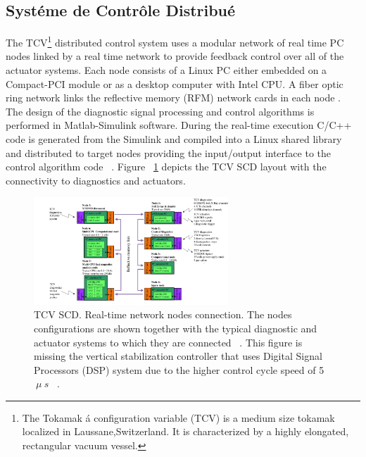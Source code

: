 \subsection{Syst\'eme de Contr\^ole Distribu\'e}

The TCV\footnote{The Tokamak \'a configuration variable (TCV) is  a medium size tokamak localized in Laussane,Switzerland. It is characterized by a highly elongated, rectangular vacuum vessel.} distributed control system uses a modular network of real time PC nodes linked by a real time network to provide feedback control over all of the actuator systems. Each node consists of a Linux PC either embedded on a Compact-PCI module or as a desktop computer with Intel CPU. A fiber optic ring network links the reflective memory (RFM) network cards in each node  \cite{TCVcntrl}.  The design of the diagnostic signal processing and control algorithms is performed in Matlab-Simulink software.  During the real-time execution  C/C++  code is generated from the Simulink and compiled  into a Linux shared library and distributed to target nodes  providing the input/output interface to the control algorithm code  ~\cite{TCVcntrl1}. Figure ~\ref{TCVcontrol} depicts the TCV SCD layout with the connectivity to diagnostics and actuators.


\begin{figure}[htbp]
	\centering
	\includegraphics[width=0.65\textwidth]{Chp2/TCVcntrl1.png}
	\caption{\label{TCVcontrol} TCV SCD. Real-time network nodes connection. The nodes configurations 	are shown together with the typical diagnostic and actuator systems to which they are connected  ~\cite{TCVcntrl1}. This figure is missing the vertical stabilization controller that uses  Digital Signal Processors (DSP) system due to the higher control cycle speed of 5$~ \mu~s$ ~\cite{NunoPhD}. }
\end{figure}

